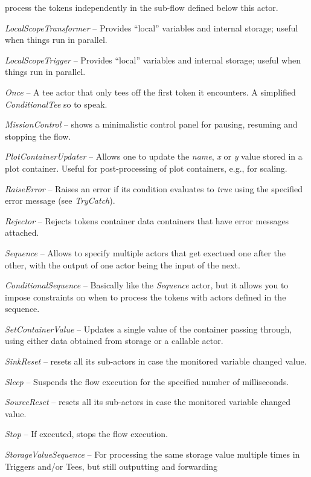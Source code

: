 \begin{tight_itemize}
	process the tokens independently in the sub-flow defined below this actor.
	\item \textit{LocalScopeTransformer} -- Provides ``local'' variables and internal
	storage; useful when things run in parallel.
	\item \textit{LocalScopeTrigger} -- Provides ``local'' variables and internal
	storage; useful when things run in parallel.
	\item \textit{Once} -- A tee actor that only tees off the first token it
	encounters. A simplified \textit{ConditionalTee} so to speak.
	\item \textit{MissionControl} -- shows a minimalistic control panel
	for pausing, resuming and stopping the flow.
	\item \textit{PlotContainerUpdater} -- Allows one to update the \textit{name},
	\textit{x} or \textit{y} value stored in a plot container. Useful for
	post-processing of plot containers, e.g., for scaling.
	\item \textit{RaiseError} -- Raises an error if its condition evaluates to
	\textit{true} using the specified error message (see \textit{TryCatch}).
	\item \textit{Rejector} -- Rejects tokens container data containers that have
	error messages attached.
	\item \textit{Sequence} -- Allows to specify multiple actors that get exectued
	one after the other, with the output of one actor being the input of the next.
	\item \textit{ConditionalSequence} -- Basically like the \textit{Sequence}
	actor, but it allows you to impose constraints on when to process the tokens
	with actors defined in the sequence.
	\item \textit{SetContainerValue} -- Updates a single value of the container
	passing through, using either data obtained from storage or a callable actor.
	\item \textit{SinkReset} -- resets all its sub-actors in case the monitored
	variable changed value.
	\item \textit{Sleep} -- Suspends the flow execution for the specified number of
	milliseconds.
	\item \textit{SourceReset} -- resets all its sub-actors in case the monitored
	variable changed value.
	\item \textit{Stop} -- If executed, stops the flow execution.
	\item \textit{StorageValueSequence} -- For processing the same storage value
	multiple times in Triggers and/or Tees, but still outputting and forwarding

\end{tight_itemize}
